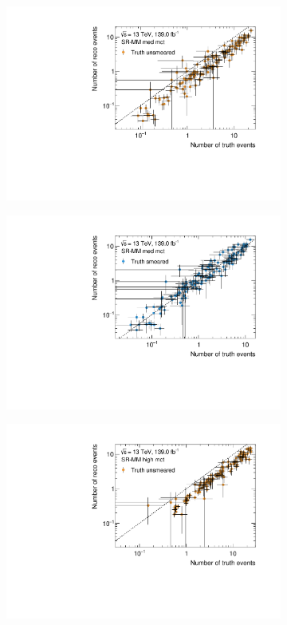 \begin{figure}
\begin{subfigure}[b]{0.49\linewidth}
	\end{subfigure}\hfill
	\begin{subfigure}[b]{0.49\linewidth}
		\centering\includegraphics[width=\textwidth]{yields_SR-MM_med_mct_unsmeared}
	\end{subfigure}\hfill
	\begin{subfigure}[b]{0.49\linewidth}
		\centering\includegraphics[width=\textwidth]{yields_SR-MM_med_mct_smeared}
	\end{subfigure}\hfill
	\begin{subfigure}[b]{0.49\linewidth}
		\centering\includegraphics[width=\textwidth]{yields_SR-MM_high_mct_unsmeared}

\end{subfigure}
\end{figure}
